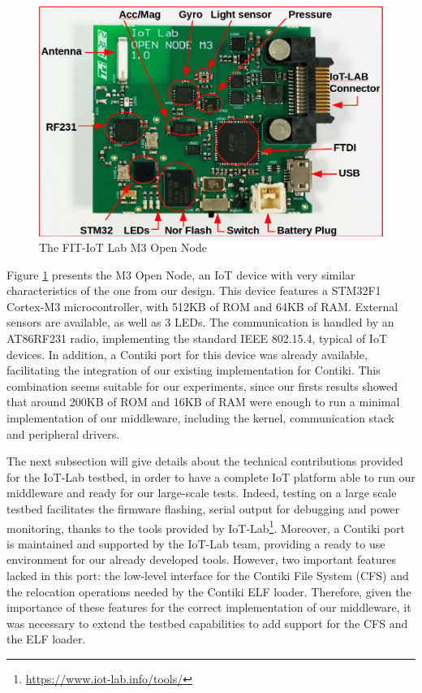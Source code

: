 \begin{figure}[htb]
	\centering
	\includegraphics[width=0.7\columnwidth]{chapters/modelsAtRuntimeContiki.images/m3opennode.png}
	\caption{The FIT-IoT Lab M3 Open Node} \label{fig:M3OpenNode}
\end{figure}

Figure \ref{fig:M3OpenNode} presents the M3 Open Node, an IoT device with very similar characteristics of the one from our design.
This device features a STM32F1 Cortex-M3 microcontroller, with 512KB of ROM and 64KB of RAM.
External sensors are available, as well as 3 LEDs.
The communication is handled by an AT86RF231 radio, implementing the standard IEEE 802.15.4, typical of IoT devices.
In addition, a Contiki port for this device was already available, facilitating the integration of our existing implementation for Contiki.
This combination seems suitable for our experiments, since our firsts results showed that around 200KB of ROM and 16KB of RAM were enough to run a minimal implementation of our middleware, including the kernel, communication stack and peripheral drivers.

The next subsection will give details about the technical contributions provided for the IoT-Lab testbed, in order to have a complete IoT platform able to run our middleware and ready for our large-scale tests.
Indeed, testing on a large scale testbed facilitates the firmware flashing, serial output for debugging and power monitoring, thanks to the tools provided by IoT-Lab\footnote{\url{https://www.iot-lab.info/tools/}}.
Moreover, a Contiki port is maintained and supported by the IoT-Lab team, providing a ready to use environment for our already developed tools.
However, two important features lacked in this port: the low-level interface for the Contiki File System (CFS) and the relocation operations needed by the Contiki ELF loader.
Therefore, given the importance of these features for the correct implementation of our middleware, it was necessary to extend the testbed capabilities to add support for the CFS and the ELF loader.


